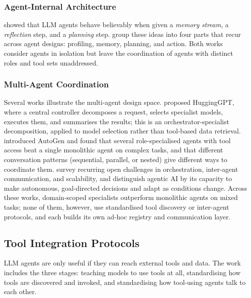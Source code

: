 \subsubsection{Agent-Internal Architecture}

\cite{park_generative_2023} showed that LLM agents behave believably when given a \textit{memory stream}, a \textit{reflection} step, and a \textit{planning} step. \cite{wang_survey_2024} group these ideas into four parts that recur across agent designs: profiling, memory, planning, and action. Both works consider agents in isolation but leave the coordination of agents with distinct roles and tool sets unaddressed.

\subsubsection{Multi-Agent Coordination}

Several works illustrate the multi-agent design space. \cite{shen_hugginggpt_2023} proposed HuggingGPT, where a central controller decomposes a request, selects specialist models, executes them, and summarises the results; this is an orchestrator-specialist decomposition, applied to model selection rather than tool-based data retrieval. \cite{wu_autogen_2023} introduced AutoGen and found that several role-specialised agents with tool access beat a single monolithic agent on complex tasks, and that different conversation patterns (sequential, parallel, or nested) give different ways to coordinate them. \cite{guo_large_2024} survey recurring open challenges in orchestration, inter-agent communication, and scalability, and \cite{acharya_agentic_2025} distinguish agentic AI by its capacity to make autonomous, goal-directed decisions and adapt as conditions change. Across these works, domain-scoped specialists outperform monolithic agents on mixed tasks; none of them, however, use standardised tool discovery or inter-agent protocols, and each builds its own ad-hoc registry and communication layer.

\subsection{Tool Integration Protocols}\label{sec:sota:protocols}

LLM agents are only useful if they can reach external tools and data. The work includes the three stages: teaching models to use tools at all, standardising how tools are discovered and invoked, and standardising how tool-using agents talk to each other.

